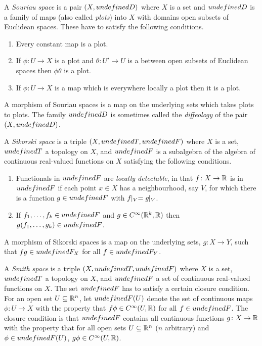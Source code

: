\documentclass[%
a4paper,%
arxiv,%
defaults
]{myclass}
\begin{document}
\begin{defn}
 A \emph{Souriau space} is a pair \((X, \m{D})\) where \(X\) is a set and \(\m{D}\) is a family of maps (also called \emph{plots}) into \(X\) with domains open subsets of Euclidean spaces.
 These have to satisfy the following conditions.
 \begin{enumerate}
 \item
  Every constant map is a plot.
 \item
  If \(\phi \colon U \to X\) is a plot and
   \(\theta \colon U' \to U\)
  is a \cimap between open subsets of Euclidean spaces then \(\phi\theta\) is a plot.
 \item
  If \(\phi \colon U \to X\) is a map which is everywhere locally a plot then it is a plot.
 \end{enumerate}

 A morphism of Souriau spaces is a map on the underlying sets which takes plots to plots.
 The family \(\m{D}\) is sometimes called the \emph{diffeology} of the pair \((X, \m{D})\).
\end{defn}

\begin{defn}
 A \emph{Sikorski space} is a triple \((X, \m{T}, \m{F})\) where \(X\) is a set, \(\m{T}\) a topology on \(X\), and \(\m{F}\) is a subalgebra of the algebra of continuous real\hyp{}valued functions on \(X\) satisfying the following conditions.
 \begin{enumerate}
 \item
  Functionals in \(\m{F}\) are \emph{locally detectable}, in that \(f \colon X \to \mathbb{R}\) is in \(\m{F}\) if each point \(x \in X\) has a neighbourhood, say \(V\), for which there is a function \(g \in \m{F}\) with
   \(f \!\!\mid_V = g \!\!\mid_V\).

 \item
  If
   \(f_1, \dotsc, f_k \in \m{F}\)
  and \(g \in C^\infty(\mathbb{R}^k, \mathbb{R})\) then
   \(g(f_1, \dotsc, g_k) \in \m{F}\).
 \end{enumerate}

 A morphism of Sikorski spaces is a map on the underlying sets, \(g \colon X \to Y\), such that \(f g \in \m{F}_X\) for all \(f \in \m{F}_Y\).
\end{defn}

\begin{defn}
A \emph{Smith space} is a triple \((X, \m{T}, \m{F})\) where \(X\) is a set, \(\m{T}\) a topology on \(X\), and \(\m{F}\) a set of continuous real\hyp{}valued functions on \(X\).
The set \(\m{F}\) has to satisfy a certain closure condition.
For an open set \(U \subseteq \mathbb{R}^n\), let \(\m{F}(U)\) denote the set of continuous maps \(\phi \colon U \to X\) with the property that \(f \phi \in C^\infty(U, \mathbb{R})\) for all \(f \in \m{F}\).
The closure condition is that \(\m{F}\) contains all continuous functions \(g \colon X \to \mathbb{R}\) with the property that for all open sets \(U \subseteq \mathbb{R}^n\) (\(n\) arbitrary) and \(\phi \in \m{F}(U)\), \(g \phi \in C^\infty(U, \mathbb{R})\).
\end{defn}
\end{document}
